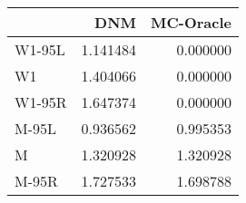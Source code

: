 \begin{tabular}{lrr}
\toprule
{} &       DNM &  MC-Oracle \\
\midrule
W1-95L &  1.141484 &   0.000000 \\
W1     &  1.404066 &   0.000000 \\
W1-95R &  1.647374 &   0.000000 \\
M-95L  &  0.936562 &   0.995353 \\
M      &  1.320928 &   1.320928 \\
M-95R  &  1.727533 &   1.698788 \\
\bottomrule
\end{tabular}
